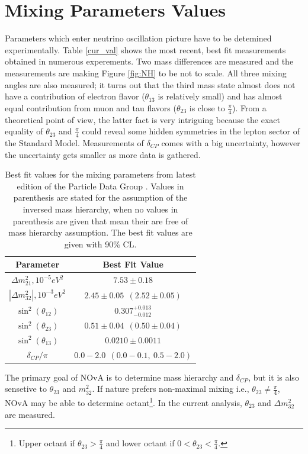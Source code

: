 \section{Mixing Parameters Values} \label{osc_param}
Parameters which enter neutrino oscillation picture have to be detemined experimentally. Table \ref{cur_val}
shows the most recent, best fit measurements obtained in numerous experements. Two mass differences are 
measured and the measurements are making Figure \ref{fig:NH} to be not to scale. All three mixing angles
are also measured; it turns out that the third mass state almost does not have a contribution of electron 
flavor ($\theta_{13}$ is relatively small) and has almost equal contribution from muon and tau flavors
($\theta_{23}$ is close to $\frac{\pi}{4}$). From a theoretical point of view, the latter fact is very 
intriguing because the exact equality of $\theta_{23}$ and $\frac{\pi}{4}$ could reveal some hidden symmetries 
in the lepton sector of the Standard Model. Measurements of $\delta_{CP}$ comes with a big uncertainty, 
however the uncertainty gets smaller as more data is gathered.
\begin{table}
\begin{center}
  \renewcommand{\arraystretch}{1.4}
  \begin{tabular}{| c | c |}
    \hline
    \textbf{Parameter}                & \textbf{Best Fit Value} \\ \hline \hline
    $\Delta  m_{21}^2,  10^{-5} eV^2$ & $7.53\pm 0.18$  \\ \hline
    $|\Delta m_{32}^2|, 10^{-3} eV^2$ & $2.45\pm 0.05~~(2.52\pm 0.05)$ \\ \hline
    $\sin^2(\theta_{12})$             & $0.307^{+0.013}_{-0.012}$ \\ \hline
    $\sin^2(\theta_{23})$             & $0.51\pm 0.04~~ (0.50\pm 0.04)$ \\ \hline
    $\sin^2(\theta_{13})$             & $0.0210\pm 0.0011$ \\ \hline
    $\delta_{CP}/\pi$                 & $0.0-2.0~~(0.0-0.1,~ 0.5-2.0)$  \\
    \hline
  \end{tabular}
\caption{Best fit values for the mixing parameters from latest edition of the Particle Data Group \cite{rpf}. 
Values in parenthesis are stated for the assumption of the inversed mass hierarchy, when no values in parenthesis 
are given that mean their are free of mass hierarchy assumption. The best fit values are given with 90\% CL.} 
\end{center}
\end{table}

The primary goal of NOvA is to determine mass hierarchy and $\delta_{CP}$, but it is also sensetive to $\theta_{23}$ and
$m_{32}^2$. If nature prefers non-maximal mixing i.e., $\theta_{23} 
\neq \frac{\pi}{4}$, NOvA may be able to determine octant\footnote{Upper octant if $\theta_{23} > \frac{\pi}{4}$
and lower octant if $0 < \theta_{23} < \frac{\pi}{4}$.}. In the current analysis, $\theta_{23}$ and 
$\Delta m_{32}^2$ are measured. 

